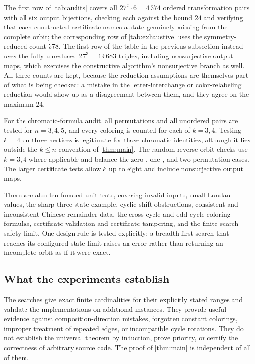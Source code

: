 \documentclass[11pt,a4paper]{article}
\numberwithin{equation}{section}
\theoremstyle{definition}
\theoremstyle{remark}
\begin{document}
\begin{remark}[Two exhaustive $n=k=3$ audits, at different reduction
levels]\label{rem:tworeductions}
The first row of \cref{tab:audits} covers all $27^2\cdot6=4\,374$ ordered
transformation pairs with all six output bijections, checking each against
the bound $24$ and verifying that each constructed certificate names a state
genuinely missing from the complete orbit; the corresponding row of
\cref{tab:exhaustive} uses the symmetry-reduced count $378$. The first row of
the table in the previous subsection instead uses the fully unreduced
$27^3=19\,683$ triples, including nonsurjective output maps, which exercises
the constructive algorithm's nonsurjective branch as well. All three counts
are kept, because the reduction assumptions are themselves part of what is
being checked: a mistake in the letter-interchange or color-relabeling
reduction would show up as a disagreement between them, and they agree on the
maximum $24$.
\end{remark}

For the chromatic-formula audit, all permutations and all unordered pairs are
tested for $n=3,4,5$, and every coloring is counted for each of $k=3,4$.
Testing $k=4$ on three vertices is legitimate for those chromatic
identities, although it lies outside the $k\le n$ convention of
\cref{thm:main}. The random reverse-orbit checks use $k=3,4$ where applicable
and balance the zero-, one-, and two-permutation cases. The larger
certificate tests allow $k$ up to eight and include nonsurjective output
maps.

There are also ten focused unit tests, covering invalid inputs, small Landau
values, the sharp three-state example, cyclic-shift obstructions, consistent
and inconsistent Chinese remainder data, the cross-cycle and odd-cycle
coloring formulas, certificate validation and certificate tampering, and the
finite-search safety limit. One design rule is tested explicitly: a
breadth-first search that reaches its configured state limit raises an error
rather than returning an incomplete orbit as if it were exact.

\subsection{What the experiments establish}

The searches give exact finite cardinalities for their explicitly stated
ranges and validate the implementations on additional instances. They provide
useful evidence against composition-direction mistakes, forgotten constant
colorings, improper treatment of repeated edges, or incompatible cycle
rotations. They do not establish the universal theorem by induction, prove
priority, or certify the correctness of arbitrary source code. The proof of
\cref{thm:main} is independent of all of them.
\end{document}
